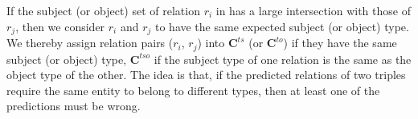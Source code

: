 If the subject (or object) set of relation $r_i$ in \KB has a large intersection with those of $r_j$, then we consider $r_i$ and $r_j$ to have the same expected subject (or object) type.
We thereby assign relation pairs ($r_i$, $r_j$) into $\bm{C}^{ts}$ (or $\bm{C}^{to}$) if they have the same subject (or object) type,
$\bm{C}^{tso}$  if the subject type of one relation is the same as the object type of the other.
The idea is that, if the predicted relations of two triples require the same entity to belong to different types, then at least one of the predictions must be wrong.

